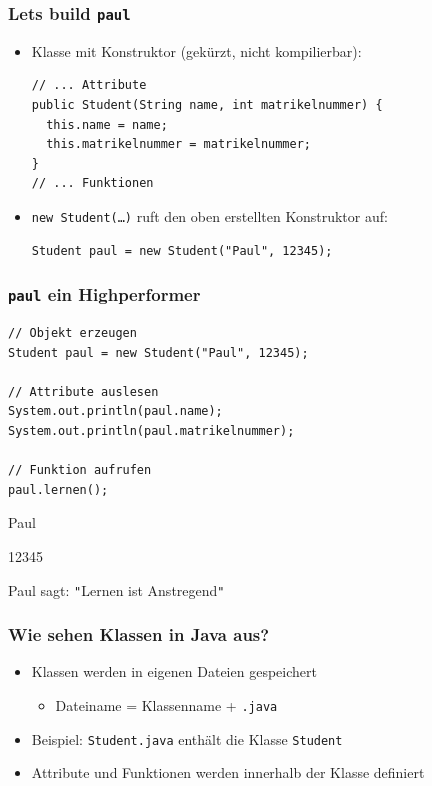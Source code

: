 \documentclass{../../presentation}
\begin{document}
\begin{frame}[fragile]
	\frametitle{Let\textquotesingle s build \texttt{paul}}
	\begin{itemize}
		\item Klasse mit Konstruktor (gekürzt, nicht kompilierbar):
		      \begin{verbatim}
// ... Attribute
public Student(String name, int matrikelnummer) {
  this.name = name;
  this.matrikelnummer = matrikelnummer;
}
// ... Funktionen
			  \end{verbatim}
		\item<2->\texttt{new Student(\dots)} ruft den oben erstellten Konstruktor auf:
		      \begin{verbatim}
Student paul = new Student("Paul", 12345);
			  \end{verbatim}
	\end{itemize}
\end{frame}

\begin{frame}[fragile]
	\frametitle{\texttt{paul} ein Highperformer}
	\begin{verbatim}
// Objekt erzeugen
Student paul = new Student("Paul", 12345);

// Attribute auslesen
System.out.println(paul.name);
System.out.println(paul.matrikelnummer);

// Funktion aufrufen
paul.lernen();
\end{verbatim}

	\begin{ausgabe}
		Paul

		12345

		Paul sagt: \texttt{"}Lernen ist Anstregend\texttt{"}
	\end{ausgabe}
\end{frame}

\begin{frame}[fragile]
	\frametitle{Wie sehen Klassen in Java aus?}
	\pause
	\begin{itemize}
		\item Klassen werden in eigenen Dateien gespeichert
		      \pause
		      \begin{itemize}
			      \item[\textbullet] Dateiname = Klassenname + \texttt{.java}
		      \end{itemize}
		      \pause
		\item Beispiel: \texttt{Student.java} enthält die Klasse \texttt{Student}
		      \pause
		\item Attribute und Funktionen werden innerhalb der Klasse definiert
	\end{itemize}
\end{frame}
\end{document}
